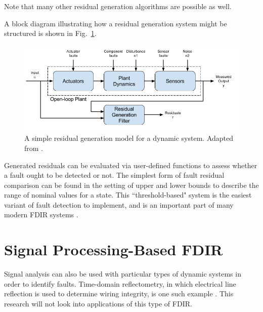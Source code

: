 Note that many other residual generation algorithms are possible as well.

A block diagram illustrating how a residual generation system might be structured is shown in Fig.~\ref{fig:residual_block_diagram}.

\begin{figure}[h]
\centering
    \includegraphics[width=\columnwidth]{images/residual_block_diagram2.png}
    \caption{A simple residual generation model for a dynamic system. Adapted from \cite{hwang2010survey}.}
    \label{fig:residual_block_diagram}
\end{figure}

Generated residuals can be evaluated via user-defined functions to assess whether a fault ought to be detected or not. The simplest form of fault residual comparison can be found in the setting of upper and lower bounds to describe the range of nominal values for a state. This ``threshold-based" system is the easiest variant of fault detection to implement, and is an important part of many modern FDIR systems \cite{walker1979fault}.

\section{Signal Processing-Based FDIR}

Signal analysis can also be used with particular types of dynamic systems in order to identify faults. Time-domain reflectometry, in which electrical line reflection is used to determine wiring integrity, is one such example \cite{lo2005noise}. This research will not look into applications of this type of FDIR.



